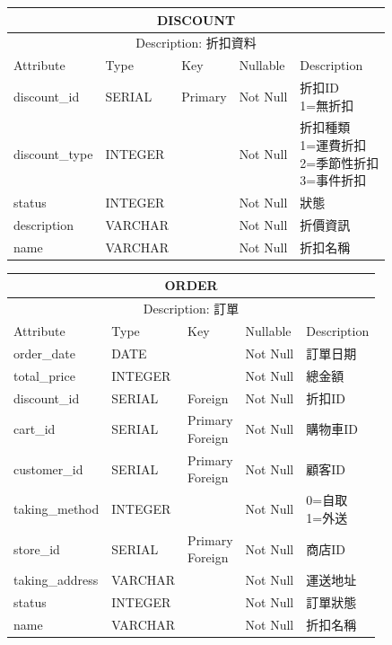 \documentclass[a4paper, 12pt]{article}
\begin{document}
\noindent\begin{tabular}{ | p{7em} | p{5.5em} | p{5.5em} | p{4.5em} | p{11em} |}
  \hline
  \multicolumn{5}{|c|}{DISCOUNT} \tabularnewline
  \hline 
  \multicolumn{5}{|c|}{Description: 折扣資料} \tabularnewline
  \hline 
  Attribute & Type & Key & Nullable & Description \\
  \hline
  discount_id & SERIAL & Primary & Not Null & \makecell[l]{折扣ID\\1=無折扣} \\
  \hline
  discount_type & INTEGER &  & Not Null & \makecell[l]{折扣種類\\1=運費折扣\\2=季節性折扣\\3=事件折扣} \\
  \hline
  status & INTEGER & &Not Null &狀態\\
  \hline
  description& VARCHAR &  &Not Null &折價資訊\\
  \hline
  name & VARCHAR &  &Not Null &折扣名稱\\
  \hline
\end{tabular}
\vspace{1em}

\noindent\begin{tabular}{ | p{7em} | p{5.5em} | p{5.5em} | p{4.5em} | p{11em} |}
  \hline
  \multicolumn{5}{|c|}{ORDER} \tabularnewline
  \hline 
  \multicolumn{5}{|c|}{Description: 訂單} \tabularnewline
  \hline 
  Attribute & Type & Key & Nullable & Description \\
  \hline
  order_date & DATE &  & Not Null & 訂單日期 \\
  \hline
  total_price & INTEGER &  & Not Null & 總金額 \\
  \hline
  discount_id & SERIAL & Foreign&Not Null &折扣ID\\
  \hline
  cart_id& SERIAL & \makecell[l]{Primary \\ Foreign} &Not Null &購物車ID\\
  \hline
  customer_id & SERIAL & \makecell[l]{Primary \\ Foreign} & Not Null & 顧客ID \\
  \hline
  taking_method & INTEGER &  & Not Null &  \makecell[l]{0=自取\\1=外送}\\
  \hline
  store_id & SERIAL & \makecell[l]{Primary \\ Foreign} & Not Null & 商店ID \\
  \hline
  taking_address & VARCHAR &  & Not Null & 運送地址 \\
  \hline
  status & INTEGER &  & Not Null & 訂單狀態 \\
  \hline
  
  name & VARCHAR &  &Not Null &折扣名稱\\
  \hline
\end{tabular}
\end{document}
